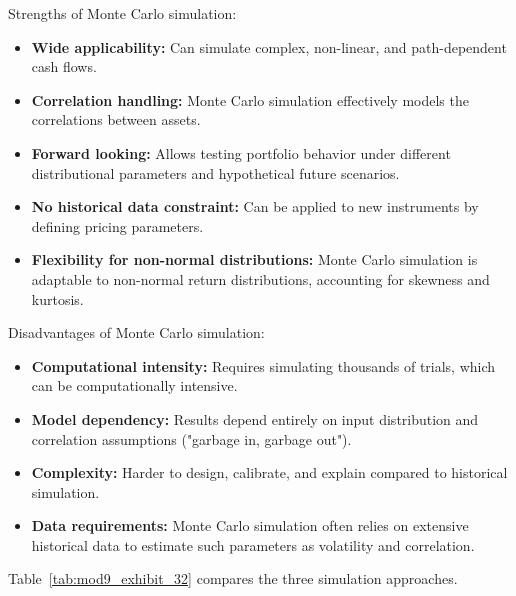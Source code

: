 Strengths of Monte Carlo simulation:
\begin{itemize}
	\item \textbf{Wide applicability:} Can simulate complex, non-linear, and path-dependent cash flows.
	\item \textbf{Correlation handling:} Monte Carlo simulation effectively models the correlations between assets.
	\item \textbf{Forward looking:} Allows testing portfolio behavior under different distributional parameters and hypothetical future scenarios.
	\item \textbf{No historical data constraint:} Can be applied to new instruments by defining pricing parameters.
	\item \textbf{Flexibility for non-normal distributions:} Monte Carlo simulation is adaptable to non-normal return distributions, accounting for skewness and kurtosis.
\end{itemize}

Disadvantages of Monte Carlo simulation:
\begin{itemize}
	\item \textbf{Computational intensity:} Requires simulating thousands of trials, which can be computationally intensive.
	\item \textbf{Model dependency:} Results depend entirely on input distribution and correlation assumptions ("garbage in, garbage out").
	\item \textbf{Complexity:} Harder to design, calibrate, and explain compared to historical simulation.
	\item \textbf{Data requirements:} Monte Carlo simulation often relies on extensive historical data to estimate such parameters as volatility and correlation.
\end{itemize}
Table~\ref{tab:mod9_exhibit_32} compares the three simulation approaches.

\begin{table}[!htbp]
\centering
\caption{Comparison of Simulation Approaches}
\label{tab:mod9_exhibit_32}
\end{table}

